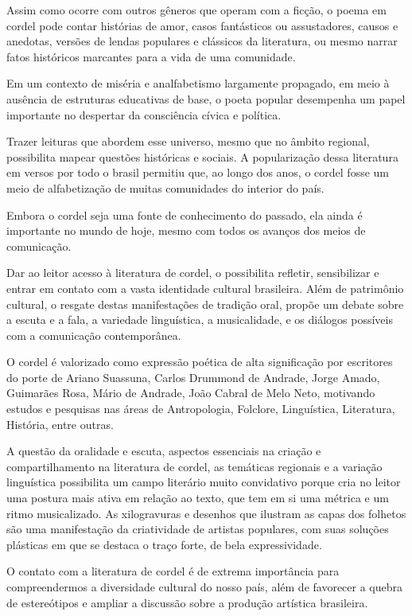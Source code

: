 \documentclass[12pt]{extarticle}
\begin{document}
Assim como ocorre com outros gêneros que operam com a ficção, o poema em cordel
pode contar histórias de amor, casos fantásticos ou assustadores, causos
e anedotas, versões de lendas populares e clássicos da literatura, ou mesmo
narrar fatos históricos marcantes para a vida de uma comunidade.

Em um contexto de miséria e analfabetismo largamente propagado, em meio
à ausência de estruturas educativas de base, o poeta popular desempenha um
papel importante no despertar da consciência cívica e política.

Trazer leituras que abordem esse universo, mesmo que no âmbito regional,
possibilita mapear questões históricas e sociais. A popularização dessa
literatura em versos por todo o brasil permitiu que, ao longo dos anos,
o cordel fosse um meio de alfabetização de muitas comunidades do interior do
país.

Embora o cordel seja uma fonte de conhecimento do passado, ela ainda
é importante no mundo de hoje, mesmo com todos os avanços dos meios de
comunicação.

Dar ao leitor acesso à literatura de cordel, o possibilita refletir,
sensibilizar e entrar em contato com a vasta identidade cultural brasileira.
Além de patrimônio cultural, o resgate destas manifestações de tradição oral,
propõe um debate sobre a escuta e a fala, a variedade linguística,
a musicalidade, e os diálogos possíveis com a comunicação contemporânea.

O cordel é valorizado como expressão poética de alta significação por
escritores do porte de Ariano Suassuna, Carlos Drummond de Andrade, Jorge
Amado, Guimarães Rosa, Mário de Andrade, João Cabral de Melo Neto, motivando
estudos e pesquisas nas áreas de Antropologia, Folclore, Linguística,
Literatura, História, entre outras.

A questão da oralidade e escuta, aspectos essenciais na criação
e compartilhamento na literatura de cordel, as temáticas regionais e a variação
linguística possibilita um campo literário muito convidativo porque cria no
leitor uma postura mais ativa em relação ao texto, que tem em si uma métrica
e um ritmo musicalizado. As xilogravuras e desenhos que ilustram as capas dos
folhetos são uma manifestação da criatividade de artistas populares, com suas
soluções plásticas em que se destaca o traço forte, de bela expressividade.

O contato com a literatura de cordel é de extrema importância para
compreendermos a diversidade cultural do nosso país, além de favorecer a quebra
de estereótipos e ampliar a discussão sobre a produção artística brasileira.
\end{document}
